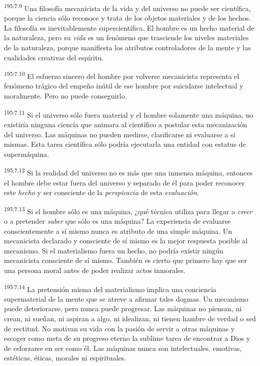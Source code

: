 \par
\textsuperscript{195:7.9} Una filosofía mecanicista de la vida y del universo no puede ser científica, porque la ciencia sólo reconoce y trata de los objetos materiales y de los hechos. La filosofía es inevitablemente supercientífica. El hombre es un hecho material de la naturaleza, pero su \textit{vida} es un fenómeno que trasciende los niveles materiales de la naturaleza, porque manifiesta los atributos controladores de la mente y las cualidades creativas del espíritu.

\par
\textsuperscript{195:7.10} El esfuerzo sincero del hombre por volverse mecanicista representa el fenómeno trágico del empeño inútil de ese hombre por suicidarse intelectual y moralmente. Pero no puede conseguirlo.

\par
\textsuperscript{195:7.11} Si el universo sólo fuera material y el hombre solamente una máquina, no existiría ninguna ciencia que animara al científico a postular esta mecanización del universo. Las máquinas no pueden medirse, clasificarse ni evaluarse a sí mismas. Esta tarea científica sólo podría ejecutarla una entidad con estatus de supermáquina.

\par
\textsuperscript{195:7.12} Si la realidad del universo no es más que una inmensa máquina, entonces el hombre debe estar fuera del universo y separado de él para poder reconocer este \textit{hecho} y ser consciente de la \textit{perspicacia} de esta \textit{evaluación}.

\par
\textsuperscript{195:7.13} Si el hombre sólo es una máquina, ¿qué técnica utiliza para llegar a \textit{creer} o a pretender \textit{saber} que sólo es una máquina? La experiencia de evaluarse conscientemente a sí mismo nunca es atributo de una simple máquina. Un mecanicista declarado y consciente de sí mismo es la mejor respuesta posible al mecanismo. Si el materialismo fuera un hecho, no podría existir ningún mecanicista consciente de sí mismo. También es cierto que primero hay que ser una persona moral antes de poder realizar actos inmorales.

\par
\textsuperscript{195:7.14} La pretensión misma del materialismo implica una conciencia supermaterial de la mente que se atreve a afirmar tales dogmas. Un mecanismo puede deteriorarse, pero nunca puede progresar. Las máquinas no piensan, ni crean, ni sueñan, ni aspiran a algo, ni idealizan, ni tienen hambre de verdad o sed de rectitud. No motivan su vida con la pasión de servir a otras máquinas y escoger como meta de su progreso eterno la sublime tarea de encontrar a Dios y de esforzarse en ser como él. Las máquinas nunca son intelectuales, emotivas, estéticas, éticas, morales ni espirituales.

